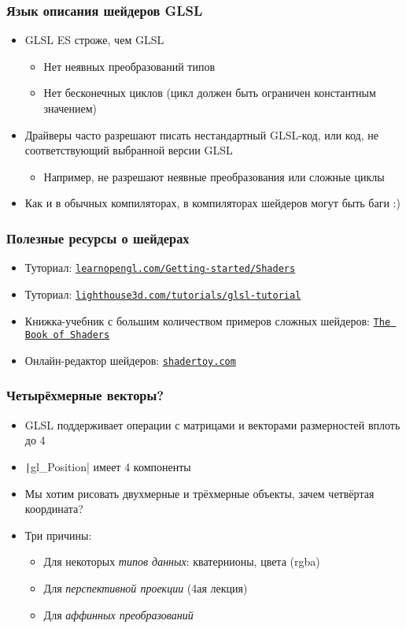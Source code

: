 \documentclass[10pt]{beamer}
\begin{document}
\begin{frame}[fragile]
\frametitle{Язык описания шейдеров GLSL}
\begin{itemize}
\item GLSL ES строже, чем GLSL
\begin{itemize}
\item Нет неявных преобразований типов
\item Нет бесконечных циклов (цикл должен быть ограничен константным значением)
\end{itemize}
\pause
\item Драйверы часто разрешают писать нестандартный GLSL-код, или код, не соответствующий выбранной версии GLSL
\begin{itemize}
\item Например, не разрешают неявные преобразования или сложные циклы
\end{itemize}
\pause
\item Как и в обычных компиляторах, в компиляторах шейдеров могут быть баги :)
\end{itemize}
\end{frame}

\begin{frame}[fragile]
\frametitle{Полезные ресурсы о шейдерах}
\begin{itemize}
\item Туториал: \href{https://learnopengl.com/Getting-started/Shaders}{\nolinkurl{learnopengl.com/Getting-started/Shaders}}
\item Туториал: \href{https://www.lighthouse3d.com/tutorials/glsl-tutorial}{\nolinkurl{lighthouse3d.com/tutorials/glsl-tutorial}}
\pause
\item Книжка-учебник с большим количеством примеров сложных шейдеров: \href{https://thebookofshaders.com/00/}{\texttt{The Book of Shaders}}
\pause
\item Онлайн-редактор шейдеров: \href{https://shadertoy.com/}{\nolinkurl{shadertoy.com}}
\end{itemize}
\end{frame}

\begin{frame}[fragile]
\frametitle{Четырёхмерные векторы?}
\begin{itemize}
\item GLSL поддерживает операции с матрицами и векторами размерностей вплоть до 4
\item \texttt|gl_Position| имеет 4 компоненты
\pause
\item Мы хотим рисовать двухмерные и трёхмерные объекты, зачем четвёртая координата?
\pause
\item Три причины:
\pause
\begin{itemize}
\item Для некоторых \textit{типов данных}: кватернионы, цвета (rgba)
\pause
\item Для \textit{перспективной проекции} (4ая лекция)
\pause
\item Для \textit{аффинных преобразований}
\end{itemize}
\end{itemize}
\end{frame}
\end{document}
